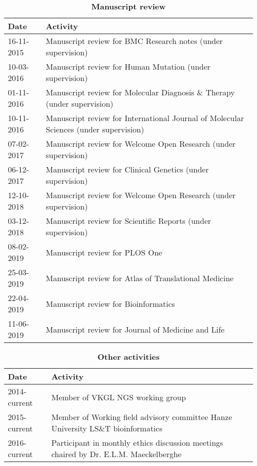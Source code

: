 \begin{appendices}
	\begin{table}
		\caption*{\textbf{Manuscript review}}
		\footnotesize
		\begin{tabulary}{\linewidth}{LL}
			Date & Activity \\
			\hline
			\rule{0pt}{2.6ex}\mbox{16-11-2015} & Manuscript review for BMC Research notes (under supervision)\\
			\rule{0pt}{2.6ex}\mbox{10-03-2016} & Manuscript review for Human Mutation (under supervision)\\
			\rule{0pt}{2.6ex}\mbox{01-11-2016} & Manuscript review for Molecular Diagnosis \& Therapy (under supervision)\\
			\rule{0pt}{2.6ex}\mbox{10-11-2016} & Manuscript review for International Journal of Molecular Sciences (under supervision)\\
			\rule{0pt}{2.6ex}\mbox{07-02-2017} & Manuscript review for Welcome Open Research (under supervision)\\
			\rule{0pt}{2.6ex}\mbox{06-12-2017} & Manuscript review for Clinical Genetics (under supervision)\\
			\rule{0pt}{2.6ex}\mbox{12-10-2018} & Manuscript review for Welcome Open Research (under supervision)\\
			\rule{0pt}{2.6ex}\mbox{03-12-2018} & Manuscript review for Scientific Reports (under supervision)\\
			\rule{0pt}{2.6ex}\mbox{08-02-2019} & Manuscript review for PLOS One\\
			\rule{0pt}{2.6ex}\mbox{25-03-2019} & Manuscript review for Atlas of Translational Medicine\\
			\rule{0pt}{2.6ex}\mbox{22-04-2019} & Manuscript review for Bioinformatics \\
			\rule{0pt}{2.6ex}\mbox{11-06-2019} & Manuscript review for Journal of Medicine and Life\\
			\hline
		\end{tabulary}
		\label{table:appendix_activities_5}
		\end{table}
			
			
	\begin{table}
		\caption*{\textbf{Other activities}}
		\footnotesize
		\begin{tabulary}{\linewidth}{LL}
			Date & Activity \\
			\hline	
			\rule{0pt}{2.6ex}\mbox{2014-current} & Member of VKGL NGS working group \\
			\rule{0pt}{2.6ex}\mbox{2015-current} & Member of Working field advisory committee Hanze University LS\&T bioinformatics \\
			\rule{0pt}{2.6ex}\mbox{2016-current} & Participant in monthly ethics discussion meetings chaired by Dr. E.L.M. Maeckelberghe \\
			\hline
		\end{tabulary}
		\label{table:appendix_activities_6}
	\end{table}


\end{appendices}
